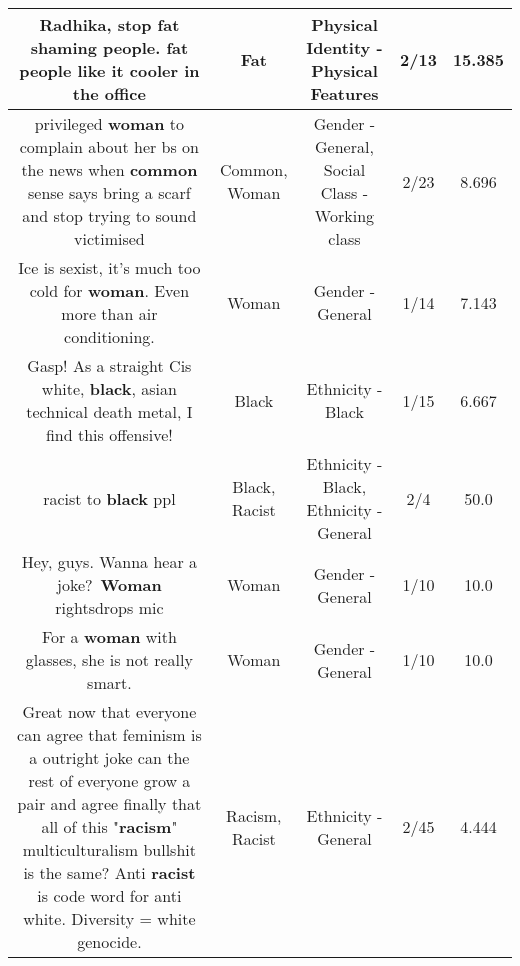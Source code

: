 \documentclass[11pt]{article}
\newlength\mylength
\begin{document}
\begin{center}
\begin{longtable}{|C{.65\mylength}|C{.30\mylength}|C{.12\mylength}|C{.12\mylength}|C{.12\mylength}|}
  \small Radhika, stop \textbf{fat} shaming people. \textbf{fat} people like it cooler in the office\normalsize   & Fat & Physical Identity - Physical Features & 2/13 & 15.385 \\  \hline
  \small privileged \textbf{woman} to complain about her bs on the news when \textbf{common} sense says bring a scarf and stop trying to sound victimised\normalsize   & Common, Woman & Gender - General, Social Class - Working class & 2/23 & 8.696 \\  \hline
  \small Ice is sexist, it's much too cold for \textbf{woman}. Even more than air conditioning.\normalsize   & Woman & Gender - General & 1/14 & 7.143 \\  \hline
  \small Gasp! As a straight Cis white, \textbf{black}, asian technical death metal, I find this offensive!\normalsize   & Black & Ethnicity - Black & 1/15 & 6.667 \\  \hline
  \small racist to \textbf{black} ppl\normalsize   & Black, Racist & Ethnicity - Black, Ethnicity - General & 2/4 & 50.0 \\  \hline
  \small Hey, guys. Wanna hear a joke? \textbf{Woman} rightsdrops mic\normalsize   & Woman & Gender - General & 1/10 & 10.0 \\  \hline
  \small For a \textbf{woman} with glasses, she is not really smart.\normalsize   & Woman & Gender - General & 1/10 & 10.0 \\  \hline
  \small Great now that everyone can agree that feminism is a outright joke can the rest of everyone grow a pair and agree finally that all of this "\textbf{racism}" multiculturalism bullshit is the same? Anti \textbf{racist} is code word for anti white. Diversity = white genocide.\normalsize   & Racism, Racist & Ethnicity - General & 2/45 & 4.444 \\  \hline

\end{longtable}
\end{center}
\end{document}
